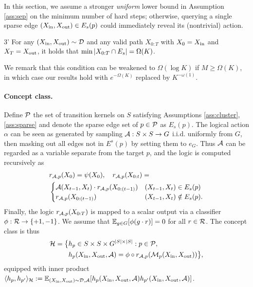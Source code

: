 In this section, we assume a stronger \emph{uniform} lower bound in Assumption \ref{ass:sep} on the minimum number of hard steps; otherwise, querying a single sparse edge $(X_{\operatorname{in}},X_{\operatorname{out}})\in E_s(p)$ could immediately reveal its (nontrivial) action.
\begin{manualtheorem}{3'}\label{ass:new}
For any $(X_{\operatorname{in}},X_{\operatorname{out}})\sim\mathcal{D}$ and any valid path $X_{0:T}$ with $X_0=X_{\operatorname{in}}$ and $X_T=X_{\operatorname{out}}$, it holds that $\min\left\lvert X_{0:T}\cap E_s\right\rvert =\Omega(K)$.
\end{manualtheorem}
We remark that this condition can be weakened to $\Omega(\log K)$ if $M\ge\Omega(K)$, in which case our results hold with $e^{-\Omega(K)}$ replaced by $K^{-\omega(1)}$.

\paragraph{Concept class.} Define $\mathcal{P}$ the set of transition kernels on $S$ satisfying Assumptions \ref{ass:cluster}, \ref{ass:sparse} and denote the sparse edge set of $p\in\mathcal{P}$ as $E_s(p)$. The logical action $\alpha$ can be seen as generated by sampling $\mathcal{A}:S\times S\to G$ i.i.d. uniformly from $G$, then masking out all edges not in $E^s(p)$ by setting them to $e_G$. Thus $\mathcal{A}$ can be regarded as a variable separate from the target $p$, and the logic is computed recursively as
\begin{align*}
&r_{\mathcal{A},p}(X_0) = \psi(X_0), \quad r_{\mathcal{A},p}(X_{0:t}) = \\
&\begin{cases}
\mathcal{A}(X_{t-1},X_t)\cdot r_{\mathcal{A},p}(X_{0:(t-1)}) & (X_{t-1},X_t) \in E_s(p) \\
r_{\mathcal{A},p}(X_{0:(t-1)}) & (X_{t-1},X_t) \notin E_s(p).
\end{cases}
\end{align*}
Finally, the logic $r_{\mathcal{A},p}(X_{0:T})$ is mapped to a scalar output via a classifier $\phi:\mathcal{R}\to\{+1,-1\}$. We assume that $\mathbb{E}_{g\in G}[\phi(g\cdot r)]=0$ for all $r\in\mathcal{R}$. The concept class is thus
\begin{align*}
\mathcal{H} = \big\{ &h_p\in S\times S\times G^{|S|\times |S|}: p\in\mathcal{P},\\
& h_p(X_{\operatorname{in}},X_{\operatorname{out}},\mathcal{A}) = \phi\circ r_{\mathcal{A},p}(\mathcal{M}_p(X_{\operatorname{in}},X_{\operatorname{out}})) \big\},
\end{align*}
equipped with inner product $\langle h_p,h_{p'}\rangle_{\mathcal{H}}:= \mathbb{E}_{(X_{\operatorname{in}},X_{\operatorname{out}})\sim\mathcal{D},\mathcal{A}}[h_p(X_{\operatorname{in}},X_{\operatorname{out}},\mathcal{A}) h_{p'}(X_{\operatorname{in}},X_{\operatorname{out}},\mathcal{A})]$.


